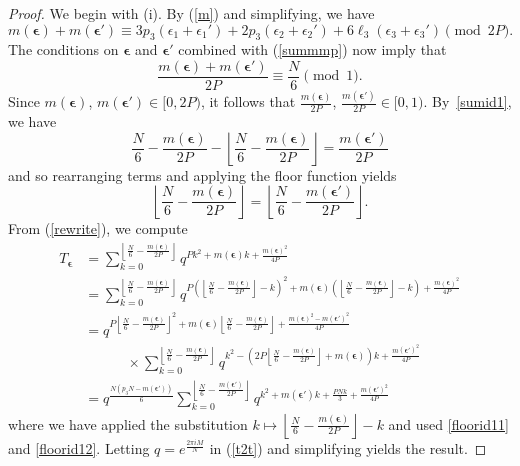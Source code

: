 \documentclass[11pt,reqno]{amsart}
\theoremstyle{definition}
\numberwithin{equation}{section}
\renewcommand{\=}{\;=\;}
\def\qqquad{\qquad\quad}
\begin{document}
\begin{proof}
We begin with (i). By (\ref{m}) and simplifying, we have
\begin{equation} \label{summmp}
m(\bm \epsilon) + m(\bm \epsilon') \equiv 3p_3 (\epsilon_1+\epsilon_1') + 2p_3 (\epsilon_2+\epsilon_2') + 6\ell_3 (\epsilon_3+\epsilon_3') \pmod{2P}.
\end{equation}
The conditions on $\bm \epsilon$ and $\bm \epsilon'$ combined with (\ref{summmp}) now imply that 
\begin{equation} \label{sumid1}
\frac{m(\bm \epsilon) + m(\bm \epsilon')}{2P} \equiv \frac {N} 6 \pmod 1.
\end{equation}
Since $m(\bm \epsilon)$, $m(\bm \epsilon') \in [0, 2P)$, it follows that $\frac{m(\bm \epsilon)}{2P}$, $\frac{m(\bm \epsilon')}{2P} \in[0,1)$. By~\eqref{sumid1}, we have
\begin{equation}\label{floorid11}
\frac N6 - \frac{m(\bm \epsilon)}{2P} - \left \lfloor\frac{N}6 - \frac{m(\bm \epsilon)}{2P} \right \rfloor = \frac{m(\bm \epsilon')}{2P}
\end{equation}
and so rearranging terms and applying the floor function yields
\begin{equation}\label{floorid12}
\left \lfloor \frac{N}6 - \frac{m(\bm \epsilon)}{2P} \right \rfloor
=\left \lfloor\frac{N}6 - \frac{m(\bm \epsilon')}{2P} \right \rfloor.
\end{equation}
From (\ref{rewrite}), we compute
\begin{equation} \label{t2t}
\begin{aligned} 
T_{\bm \epsilon} &=\sum_{k=0}^{\left \lfloor \frac N6-\frac {m(\bm \epsilon)}{2P} \right \rfloor}
q^{P k^2+m(\bm \epsilon)k +\frac{m(\bm \epsilon)^2}{4P}}\\ 
&=\sum_{k=0}^{\left \lfloor \frac N6-\frac {m(\bm \epsilon)}{2P} \right \rfloor}
q^{P \left ( \left \lfloor \frac N6-\frac {m(\bm \epsilon)}{2P} \right \rfloor-k \right)^2
+ m(\bm \epsilon) \left (\left \lfloor \frac N6-\frac {m(\bm \epsilon)}{2P} \right \rfloor-k \right )
+ \frac{m(\bm \epsilon)^2}{4P}}
\\ 
&= q^{P \left \lfloor \frac N6-\frac {m(\bm \epsilon)}{2P} \right \rfloor^2
+ m(\bm \epsilon)  \left \lfloor \frac N6-\frac {m(\bm \epsilon)}{2P} \right \rfloor
+\frac{m(\bm \epsilon)^2-m(\bm \epsilon')^2}{4P}} \\ 
&\qqquad\times\sum_{k=0}^{\left \lfloor \frac N6-\frac {m(\bm \epsilon)}{2P} \right \rfloor}
q^{k^2
- \left( 2P \left \lfloor\frac N6-\frac {m(\bm \epsilon)}{2P} \right \rfloor
  + m(\bm \epsilon) \right )k
  +\frac{m(\bm \epsilon')^2}{4P}}
\\
& = q^{\frac{N \left(p_3N-m(\bm \epsilon') \right)}{6}}
\sum_{k=0}^{\left \lfloor\frac N6-\frac {m(\bm \epsilon')}{2P} \right \rfloor}
q^{k^2+m(\bm \epsilon')k +  \frac{PNk}{3} +\frac{m(\bm \epsilon')^2}{4P}}
\end{aligned}
\end{equation}
where we have applied the substitution $k \mapsto \left \lfloor \frac N6-\frac{m(\bm \epsilon)}{2P} \right \rfloor -k$
and used \eqref{floorid11} and \eqref{floorid12}. Letting $q=e^{\frac{2\pi i M}{N}}$ in (\ref{t2t}) and simplifying yields the result.


\end{proof}
\end{document}
